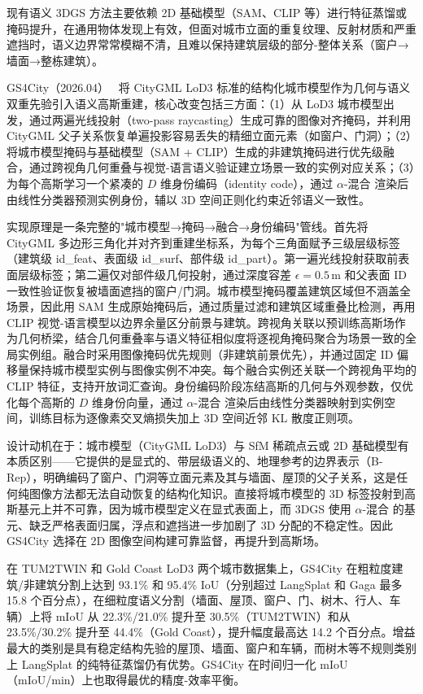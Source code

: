 现有语义 3DGS 方法主要依赖 2D 基础模型（SAM、CLIP 等）进行特征蒸馏或掩码提升，在通用物体发现上有效，但面对城市立面的重复纹理、反射材质和严重遮挡时，语义边界常常模糊不清，且难以保持建筑层级的部分-整体关系（窗户→墙面→整栋建筑）。

GS4City（2026.04）~\cite{2604_11401} 将 CityGML LoD3 标准的结构化城市模型作为几何与语义双重先验引入语义高斯重建，核心改变包括三方面：（1）从 LoD3 城市模型出发，通过两遍光线投射（two-pass raycasting）生成可靠的图像对齐掩码，并利用 CityGML 父子关系恢复单遍投影容易丢失的精细立面元素（如窗户、门洞）；（2）将城市模型掩码与基础模型（SAM + CLIP）生成的非建筑掩码进行优先级融合，通过跨视角几何重叠与视觉-语言语义验证建立场景一致的实例对应关系；（3）为每个高斯学习一个紧凑的 $D$ 维身份编码（identity code），通过 $\alpha$-混合 渲染后由线性分类器预测实例身份，辅以 3D 空间正则化约束近邻语义一致性。

实现原理是一条完整的"城市模型→掩码→融合→身份编码"管线。首先将 CityGML 多边形三角化并对齐到重建坐标系，为每个三角面赋予三级层级标签（建筑级 id\_feat、表面级 id\_surf、部件级 id\_part）。第一遍光线投射获取前表面层级标签；第二遍仅对部件级几何投射，通过深度容差 $\epsilon=0.5$\,m 和父表面 ID 一致性验证恢复被墙面遮挡的窗户/门洞。城市模型掩码覆盖建筑区域但不涵盖全场景，因此用 SAM 生成原始掩码后，通过质量过滤和建筑区域重叠比检测，再用 CLIP 视觉-语言模型以边界余量区分前景与建筑。跨视角关联以预训练高斯场作为几何桥梁，结合几何重叠率与语义特征相似度将逐视角掩码聚合为场景一致的全局实例组。融合时采用图像掩码优先规则（非建筑前景优先），并通过固定 ID 偏移量保持城市模型实例与图像实例不冲突。每个融合实例还关联一个跨视角平均的 CLIP 特征，支持开放词汇查询。身份编码阶段冻结高斯的几何与外观参数，仅优化每个高斯的 $D$ 维身份向量，通过 $\alpha$-混合 渲染后由线性分类器映射到实例空间，训练目标为逐像素交叉熵损失加上 3D 空间近邻 KL 散度正则项。

设计动机在于：城市模型（CityGML LoD3）与 SfM 稀疏点云或 2D 基础模型有本质区别——它提供的是显式的、带层级语义的、地理参考的边界表示（B-Rep），明确编码了窗户、门洞等立面元素及其与墙面、屋顶的父子关系，这是任何纯图像方法都无法自动恢复的结构化知识。直接将城市模型的 3D 标签投射到高斯基元上并不可靠，因为城市模型定义在显式表面上，而 3DGS 使用 $\alpha$-混合 的基元、缺乏严格表面归属，浮点和遮挡进一步加剧了 3D 分配的不稳定性。因此 GS4City 选择在 2D 图像空间构建可靠监督，再提升到高斯场。

在 TUM2TWIN 和 Gold Coast LoD3 两个城市数据集上，GS4City 在粗粒度建筑/非建筑分割上达到 93.1\% 和 95.4\% IoU（分别超过 LangSplat 和 Gaga 最多 15.8 个百分点），在细粒度语义分割（墙面、屋顶、窗户、门、树木、行人、车辆）上将 mIoU 从 22.3\%/21.0\% 提升至 30.5\%（TUM2TWIN）和从 23.5\%/30.2\% 提升至 44.4\%（Gold Coast），提升幅度最高达 14.2 个百分点。增益最大的类别是具有稳定结构先验的屋顶、墙面、窗户和车辆，而树木等不规则类别上 LangSplat 的纯特征蒸馏仍有优势。GS4City 在时间归一化 mIoU（mIoU/min）上也取得最优的精度-效率平衡。

